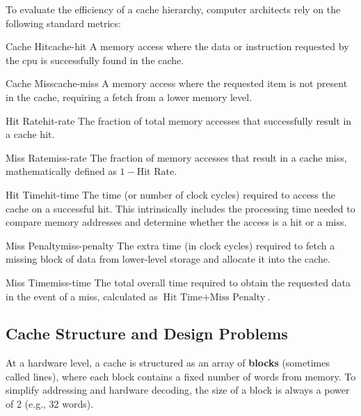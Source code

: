 To evaluate the efficiency of a cache hierarchy, computer architects rely on the following standard metrics:

\begin{definition}{Cache Hit}{cache-hit}
    A memory access where the data or instruction requested by the \gls{cpu} is successfully found in the cache.
\end{definition}

\begin{definition}{Cache Miss}{cache-miss}
    A memory access where the requested item is not present in the cache, requiring a fetch from a lower memory level.
\end{definition}

\begin{definition}{Hit Rate}{hit-rate}
    The fraction of total memory accesses that successfully result in a cache hit.
\end{definition}

\begin{definition}{Miss Rate}{miss-rate}
    The fraction of memory accesses that result in a cache miss, mathematically defined as $1 - \text{Hit Rate}$.
\end{definition}

\begin{definition}{Hit Time}{hit-time}
    The time (or number of clock cycles) required to access the cache on a successful hit. This intrinsically includes the processing time needed to compare memory addresses and determine whether the access is a hit or a miss.
\end{definition}

\begin{definition}{Miss Penalty}{miss-penalty}
    The extra time (in clock cycles) required to fetch a missing block of data from lower-level storage and allocate it into the cache.
\end{definition}

\begin{definition}{Miss Time}{miss-time}
    The total overall time required to obtain the requested data in the event of a miss, calculated as $\text{Hit Time} + \text{Miss Penalty}$.
\end{definition}

\subsection{Cache Structure and Design Problems}
At a hardware level, a cache is structured as an array of \textbf{blocks} (sometimes called lines), where each block contains a fixed number of words from memory. To simplify addressing and hardware decoding, the size of a block is always a power of 2 (e.g., 32 words). 

